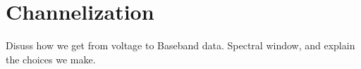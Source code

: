\chapter{Channelization}

Disuss how we get from voltage to Baseband data. Spectral window, and explain the choices we make.